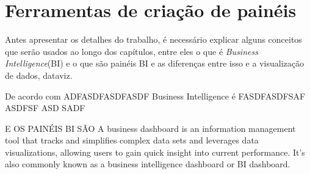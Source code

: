 \chapter{Ferramentas de criação de painéis}\label{cap_trabalho_academico}

Antes apresentar os detalhes do trabalho, é necessário explicar alguns conceitos que serão usados ao longo dos capítulos, entre eles o que é \textit{Business Intelligence}(BI) e o que são painéis BI e as diferenças entre isso e a visualização de dados, dataviz.

De acordo com ADFASDFASDFASDF Business Intelligence é FASDFASDFSAF ASDFSF ASD SADF

E OS PAINÉIS BI SÃO A business dashboard is an information management tool that tracks and simplifies complex data sets and leverages data visualizations, allowing users to gain quick insight into current performance. It's also commonly known as a business intelligence dashboard or BI dashboard.

